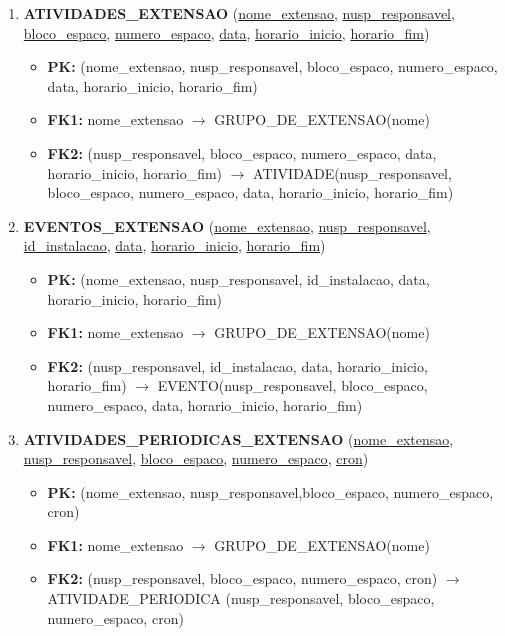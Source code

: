 \documentclass{article}
\begin{document}
\begin{enumerate}
    \item \textbf{ATIVIDADES\_EXTENSAO} (\underline{nome\_extensao}, \underline{nusp\_responsavel}, \underline{bloco\_espaco}, \underline{numero\_espaco}, \underline{data}, \underline{horario\_inicio}, \underline{horario\_fim})
        \begin{itemize}
            \item \textbf{PK:} (nome\_extensao, nusp\_responsavel, bloco\_espaco, numero\_espaco, data, horario\_inicio, horario\_fim)
            \item \textbf{FK1:} nome\_extensao $\rightarrow$ GRUPO\_DE\_EXTENSAO(nome)
            \item \textbf{FK2:} (nusp\_responsavel, bloco\_espaco, numero\_espaco, data, horario\_inicio, horario\_fim) $\rightarrow$ ATIVIDADE(nusp\_responsavel, bloco\_espaco, numero\_espaco, data, horario\_inicio, horario\_fim)
        \end{itemize}

    \item \textbf{EVENTOS\_EXTENSAO} (\underline{nome\_extensao}, \underline{nusp\_responsavel}, \underline{id\_instalacao}, \underline{data}, \underline{horario\_inicio}, \underline{horario\_fim})
        \begin{itemize}
            \item \textbf{PK:} (nome\_extensao, nusp\_responsavel, id\_instalacao, data, horario\_inicio, horario\_fim)
            \item \textbf{FK1:} nome\_extensao $\rightarrow$ GRUPO\_DE\_EXTENSAO(nome)
            \item \textbf{FK2:} (nusp\_responsavel, id\_instalacao, data, horario\_inicio, horario\_fim) $\rightarrow$ EVENTO(nusp\_responsavel, bloco\_espaco, numero\_espaco, data, horario\_inicio, horario\_fim)
        \end{itemize}
        
    \item \textbf{ATIVIDADES\_PERIODICAS\_EXTENSAO} (\underline{nome\_extensao}, \underline{nusp\_responsavel}, \underline{bloco\_espaco}, \underline{numero\_espaco}, \underline{cron})
        \begin{itemize}
            \item \textbf{PK:} (nome\_extensao, nusp\_responsavel,bloco\_espaco, numero\_espaco, cron)
            \item \textbf{FK1:} nome\_extensao $\rightarrow$ GRUPO\_DE\_EXTENSAO(nome)
            \item \textbf{FK2:} (nusp\_responsavel, bloco\_espaco, numero\_espaco, cron) $\rightarrow$ ATIVIDADE\_PERIODICA (nusp\_responsavel, bloco\_espaco, numero\_espaco, cron)
        \end{itemize}


\end{enumerate}
\end{document}
